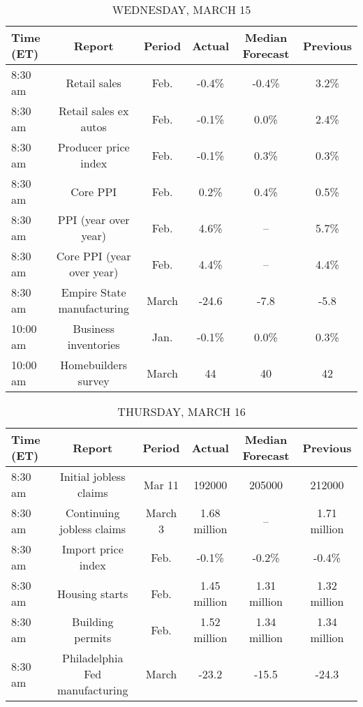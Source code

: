 \documentclass{article}%
\begin{document}
\begin{table}[htbp]%
\caption{WEDNESDAY, MARCH 15}%
\centering%
\begin{adjustbox}{width=1\textwidth}%
\begin{tabular}{lccccc}
\toprule
Time (ET) &                     Report & Period & Actual & Median Forecast & Previous \\
\midrule
  8:30 am &               Retail sales &   Feb. &  -0.4\% &           -0.4\% &     3.2\% \\
  8:30 am &      Retail sales ex autos &   Feb. &  -0.1\% &            0.0\% &     2.4\% \\
  8:30 am &       Producer price index &   Feb. &  -0.1\% &            0.3\% &     0.3\% \\
  8:30 am &                   Core PPI &   Feb. &   0.2\% &            0.4\% &     0.5\% \\
  8:30 am &       PPI (year over year) &   Feb. &   4.6\% &              -- &     5.7\% \\
  8:30 am &  Core PPI (year over year) &   Feb. &   4.4\% &              -- &     4.4\% \\
  8:30 am & Empire State manufacturing &  March &  -24.6 &            -7.8 &     -5.8 \\
 10:00 am &       Business inventories &   Jan. &  -0.1\% &            0.0\% &     0.3\% \\
 10:00 am &        Homebuilders survey &  March &     44 &              40 &       42 \\
\bottomrule
\end{tabular}
%
\end{adjustbox}%
\end{table}

%


\begin{table}[htbp]%
\caption{THURSDAY, MARCH 16}%
\centering%
\begin{adjustbox}{width=1\textwidth}%
\begin{tabular}{lccccc}
\toprule
Time (ET) &                         Report &  Period &       Actual & Median Forecast &     Previous \\
\midrule
  8:30 am &         Initial jobless claims &  Mar 11 &       192000 &          205000 &       212000 \\
  8:30 am &      Continuing jobless claims & March 3 & 1.68 million &              -- & 1.71 million \\
  8:30 am &             Import price index &    Feb. &        -0.1\% &           -0.2\% &        -0.4\% \\
  8:30 am &                 Housing starts &    Feb. & 1.45 million &    1.31 million & 1.32 million \\
  8:30 am &               Building permits &    Feb. & 1.52 million &    1.34 million & 1.34 million \\
  8:30 am & Philadelphia Fed manufacturing &   March &        -23.2 &           -15.5 &        -24.3 \\
\bottomrule
\end{tabular}
%
\end{adjustbox}%
\end{table}
\end{document}
